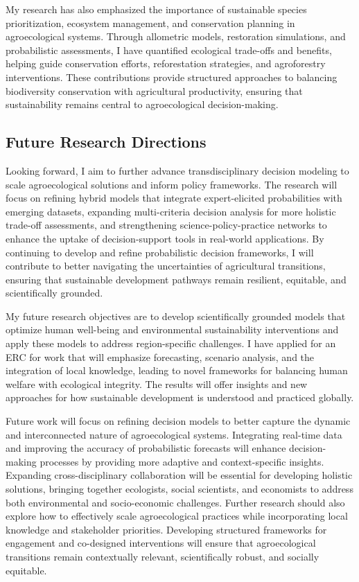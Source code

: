 \documentclass[
]{article}
\begin{document}
My research has also emphasized the importance of sustainable species
prioritization, ecosystem management, and conservation planning in
agroecological systems. Through allometric models, restoration
simulations, and probabilistic assessments, I have quantified ecological
trade-offs and benefits, helping guide conservation efforts,
reforestation strategies, and agroforestry interventions. These
contributions provide structured approaches to balancing biodiversity
conservation with agricultural productivity, ensuring that
sustainability remains central to agroecological decision-making.

\hypertarget{future-research-directions}{%
\subsection{Future Research
Directions}\label{future-research-directions}}

Looking forward, I aim to further advance transdisciplinary decision
modeling to scale agroecological solutions and inform policy frameworks.
The research will focus on refining hybrid models that integrate
expert-elicited probabilities with emerging datasets, expanding
multi-criteria decision analysis for more holistic trade-off
assessments, and strengthening science-policy-practice networks to
enhance the uptake of decision-support tools in real-world applications.
By continuing to develop and refine probabilistic decision frameworks, I
will contribute to better navigating the uncertainties of agricultural
transitions, ensuring that sustainable development pathways remain
resilient, equitable, and scientifically grounded.

My future research objectives are to develop scientifically grounded
models that optimize human well-being and environmental sustainability
interventions and apply these models to address region-specific
challenges. I have applied for an ERC for work that will emphasize
forecasting, scenario analysis, and the integration of local knowledge,
leading to novel frameworks for balancing human welfare with ecological
integrity. The results will offer insights and new approaches for how
sustainable development is understood and practiced globally.

Future work will focus on refining decision models to better capture the
dynamic and interconnected nature of agroecological systems. Integrating
real-time data and improving the accuracy of probabilistic forecasts
will enhance decision-making processes by providing more adaptive and
context-specific insights. Expanding cross-disciplinary collaboration
will be essential for developing holistic solutions, bringing together
ecologists, social scientists, and economists to address both
environmental and socio-economic challenges. Further research should
also explore how to effectively scale agroecological practices while
incorporating local knowledge and stakeholder priorities. Developing
structured frameworks for engagement and co-designed interventions will
ensure that agroecological transitions remain contextually relevant,
scientifically robust, and socially equitable.
\end{document}
